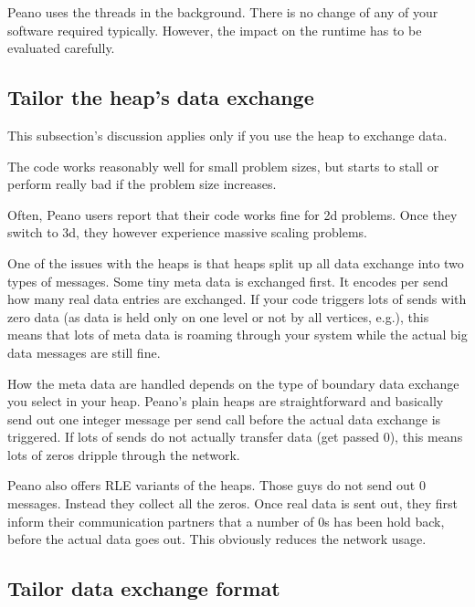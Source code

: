 Peano uses the threads in the background.
There is no change of any of your software required typically.
However, the impact on the runtime has to be evaluated carefully.





\subsection{Tailor the heap's data exchange}

This subsection's discussion applies only if you use the heap to exchange data.

\begin{smell}
  The code works reasonably well for small problem sizes, but starts to stall or
  perform really bad if the problem size increases.
\end{smell}


\noindent
Often, Peano users report that their code works fine for 2d problems. Once they
switch to 3d, they however experience massive scaling problems.

One of the issues with the heaps is that heaps split up all data exchange into
two types of messages. 
Some tiny meta data is exchanged first. 
It encodes per send how many real data entries are exchanged.
If your code triggers lots of sends with zero data (as data is held only on one
level or not by all vertices, e.g.), this means that lots of meta data is
roaming through your system while the actual big data messages are still fine.

How the meta data are handled depends on the type of boundary data exchange you
select in your heap.
Peano's plain heaps are straightforward and basically send out one integer message per 
send call before the actual data exchange is triggered.
If lots of sends do not actually transfer data (get passed 0), this means lots of zeros 
dripple through the network.

Peano also offers RLE variants of the heaps.
Those guys do not send out 0 messages.
Instead they collect all the zeros. 
Once real data is sent out, they first inform their communication partners that 
a number of 0s has been hold back, before the actual data goes out.
This obviously reduces the network usage.


\subsection{Tailor data exchange format}

